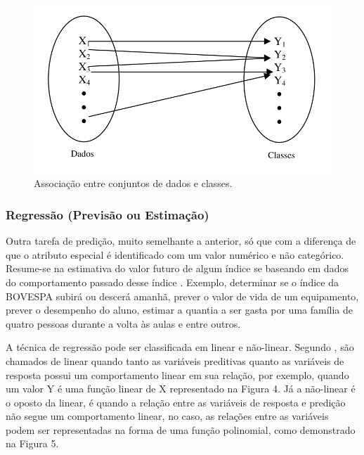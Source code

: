 \begin{figure}[!htp]
	\begin{center}
    \caption{\label{fig:waveform_fig} Associação entre conjuntos de dados e classes.}
	\includegraphics[scale=0.70]{Figuras/Classificacao.png}
	\end{center}
\end{figure}


\subsubsection{Regressão (Previsão ou Estimação)}

\par
Outra tarefa de predição, muito semelhante a anterior, só que com a diferença de que o atributo especial é identificado com um valor numérico e não categórico. Resume-se na estimativa do valor futuro de algum índice se baseando em dados do comportamento passado desse índice \cite{Camilo2009, LeandroSilva2014}. Exemplo, determinar se o índice da BOVESPA subirá ou descerá amanhã, prever o valor de vida de um equipamento, prever o desempenho do aluno, estimar a quantia a ser gasta por uma família de quatro pessoas durante a volta às aulas e entre outros.

\par
A técnica de regressão pode ser classificada em linear e não-linear. Segundo , são chamados de linear quando tanto as variáveis preditivas quanto as variáveis de resposta possui um comportamento linear em sua relação, por exemplo, quando um valor Y é uma função linear de X representado na Figura 4. Já a não-linear é o oposto da linear, é quando a relação entre as variáveis de resposta e predição não segue um comportamento linear, no caso, as relações entre as variáveis podem ser representadas na forma de uma função polinomial, como demonstrado na Figura 5. 


